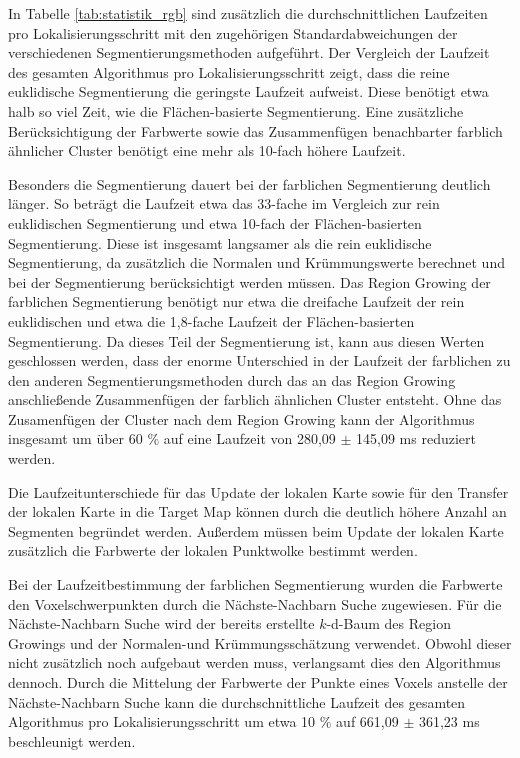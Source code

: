 In Tabelle \ref{tab:statistik_rgb} sind zusätzlich die durchschnittlichen Laufzeiten pro Lokalisierungsschritt mit den zugehörigen Standardabweichungen der verschiedenen \linebreak Segmentierungsmethoden aufgeführt. Der Vergleich der Laufzeit des gesamten Algorithmus pro Lokalisierungsschritt zeigt, dass die reine euklidische Segmentierung die geringste Laufzeit aufweist. Diese benötigt etwa halb so viel Zeit, wie die Flächen-basierte Segmentierung. Eine zusätzliche Berücksichtigung der Farbwerte sowie das Zusammenfügen benachbarter farblich ähnlicher Cluster benötigt eine mehr als 10-fach höhere Laufzeit. 

Besonders die Segmentierung dauert bei der farblichen Segmentierung deutlich länger. So beträgt die Laufzeit etwa das 33-fache im Vergleich zur  rein euklidischen Segmentierung und etwa 10-fach der Flächen-basierten Segmentierung. Diese ist insgesamt langsamer als die rein euklidische Segmentierung, da zusätzlich die Normalen und Krümmungswerte berechnet und bei der Segmentierung berücksichtigt werden müssen. Das Region Growing der farblichen Segmentierung benötigt nur etwa die dreifache Laufzeit der rein euklidischen und etwa die 1,8-fache Laufzeit der Flächen-basierten Segmentierung. Da dieses Teil der Segmentierung ist, kann aus diesen Werten geschlossen werden, dass der enorme Unterschied in der Laufzeit der farblichen zu den anderen Segmentierungsmethoden durch das an das Region Growing anschließende Zusammenfügen der farblich ähnlichen Cluster entsteht. Ohne das Zusamenfügen der Cluster nach dem Region Growing kann der Algorithmus insgesamt um über 60 $\%$  auf eine Laufzeit von 280,09 $\pm$ 145,09 ms reduziert werden.

Die Laufzeitunterschiede für das Update der lokalen Karte sowie für den Transfer der lokalen Karte in die Target Map können durch die deutlich höhere Anzahl an Segmenten begründet werden. Außerdem müssen beim Update der lokalen Karte zusätzlich die Farbwerte der lokalen Punktwolke bestimmt werden. 

Bei der Laufzeitbestimmung der farblichen Segmentierung wurden die Farbwerte den Voxelschwerpunkten durch die Nächste-Nachbarn Suche zugewiesen. Für die Nächste-Nachbarn Suche wird der bereits erstellte $k$-d-Baum des Region Growings und der Normalen-und Krümmungsschätzung verwendet. Obwohl dieser nicht zusätzlich noch aufgebaut werden muss, verlangsamt dies den Algorithmus dennoch. Durch die Mittelung der Farbwerte der Punkte eines Voxels anstelle der Nächste-Nachbarn Suche kann die durchschnittliche Laufzeit des gesamten Algorithmus pro Lokalisierungsschritt um etwa 10 $\%$ auf 661,09 $\pm$ 361,23 ms beschleunigt werden. 

